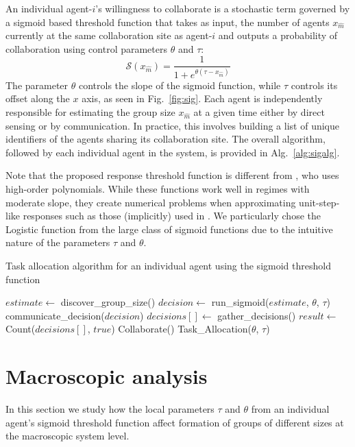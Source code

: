 \documentclass{TeXstyles/DARS/svmult}  %
\newcommand{\sig}{\mathcal{S}}
\newcommand{\xm}{x_{\hat{m}}}
\begin{document}
An individual agent-$i$'s willingness to collaborate is a stochastic term governed by a sigmoid based threshold function that takes as input, the number of agents $\xm$ currently at the same collaboration site as agent-$i$ and outputs a probability of collaboration using control parameters $\theta$ and $\tau$:
\begin{equation}
	\sig(\xm) = \frac{1}{1+e^{\theta(\tau - \xm)}}\label{eq:sig}
\end{equation}
The parameter $\theta$ controls the slope of the sigmoid function, while $\tau$ controls its offset along the $x$ axis, as seen in Fig.~\ref{fig:sig}. Each agent is independently responsible for estimating the group size $\xm$ at a given time either by direct sensing or by communication. In practice,  this involves building a list of unique identifiers of the agents sharing its collaboration site. The overall algorithm, followed by each individual agent in the system, is provided in Alg.~\ref{alg:sigalg}.

Note that the proposed response threshold function is different from \cite{Bonabeau1999}, who uses high-order polynomials. While these functions work well in regimes with moderate slope, they create numerical problems when approximating unit-step-like responses such as those (implicitly) used in \cite{Lerman2001}. We particularly chose the Logistic function from the large class of sigmoid functions due to the intuitive nature of the parameters $\tau$ and $\theta$. 

\begin{algorithm}
\caption{Task allocation algorithm for an individual agent using the sigmoid threshold function}
\label{alg:sigalg}
\begin{algorithmic}
	\State $estimate \gets$ discover\_group\_size()
	\State $decision \gets$ run\_sigmoid($estimate$, $\theta$, $\tau$)
	\State communicate\_decision($decision$)
	\State $decisions[] \gets$ gather\_decisions()
	\State $result \gets$ Count($decisions[]$, $true$) 
		\State Collaborate()
		\State \Return
	\Else
		\State Task\_Allocation($\theta$, $\tau$)
	\EndIf
	\EndFunction
\end{algorithmic} 
\end{algorithm}



\section{Macroscopic analysis}\label{sec:macromodel}
In this section we study how the local parameters $\tau$ and $\theta$ from an individual agent's sigmoid threshold function affect formation of groups of different sizes at the macroscopic system level.
\end{document}
